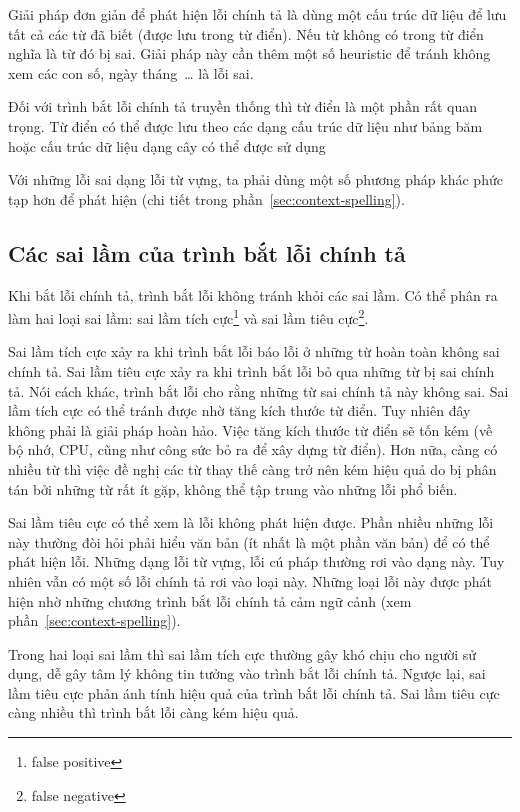\documentclass[a4paper,oneside,14pt]{extbook} %
\begin{document}
Giải pháp đơn giản để phát hiện lỗi chính tả là dùng một cấu trúc dữ
liệu để lưu tất cả các từ đã biết (được lưu trong từ điển). Nếu từ
không có trong từ điển nghĩa là từ đó bị sai. Giải pháp này cần thêm
một số heuristic để tránh không xem các con số, ngày tháng~\ldots{} là
lỗi sai.

Đối với trình bắt lỗi chính tả truyền thống thì từ điển là một phần
rất quan trọng. Từ điển có thể được lưu theo các dạng
cấu trúc dữ liệu như bảng băm hoặc cấu trúc dữ liệu dạng cây có thể
được sử dụng~\cite{McIlroy,Peterson}

Với những lỗi sai dạng lỗi từ vựng, ta phải dùng một số phương pháp
khác phức tạp hơn để phát hiện (chi tiết trong
phần~\ref{sec:context-spelling}). 

\subsection{Các sai lầm của trình bắt lỗi chính tả}

Khi bắt lỗi chính tả, trình bắt lỗi không tránh khỏi các sai lầm. Có
thể phân ra làm hai loại sai lầm: sai lầm tích cực\footnote{false
  positive} và sai lầm tiêu cực\footnote{false negative}.

Sai lầm tích cực xảy ra khi trình bắt lỗi báo lỗi ở những từ hoàn toàn
không sai chính tả. Sai lầm tiêu cực xảy ra khi trình bắt lỗi bỏ qua
những từ bị sai chính tả. Nói cách khác, trình bắt lỗi cho rằng những
từ sai chính tả này không sai. Sai lầm tích cực có thể tránh được nhờ
tăng kích thước từ điển. Tuy nhiên đây không phải là giải pháp hoàn
hảo. Việc tăng kích thước từ điển sẽ tốn kém (về bộ nhớ, CPU, cũng như
công sức bỏ ra để xây dựng từ điển). Hơn nữa, càng có nhiều
từ thì việc đề nghị các từ thay thế càng trở nên kém hiệu quả do bị
phân tán bởi những từ rất ít gặp, không thể tập trung vào những lỗi
phổ biến. 

Sai lầm tiêu cực có thể xem là lỗi không phát hiện được. Phần nhiều
những lỗi này thường đòi hỏi phải hiểu văn bản (ít nhất là một phần
văn bản) để có thể phát hiện lỗi. Những dạng lỗi từ vựng, lỗi cú pháp
thường rơi vào dạng này. Tuy nhiên vẫn có một số lỗi chính tả rơi vào
loại này. Những loại lỗi này được phát hiện nhờ những chương trình bắt
lỗi chính tả cảm ngữ cảnh (xem phần~\ref{sec:context-spelling}).


Trong hai loại sai lầm thì sai lầm tích cực thường gây khó chịu cho
người sử dụng, dễ gây tâm lý không tin tưởng vào trình bắt lỗi chính
tả. Ngược lại, sai lầm tiêu cực phản ánh tính hiệu quả của trình bắt
lỗi chính tả. Sai lầm tiêu cực càng nhiều thì trình bắt lỗi càng kém
hiệu quả.
\end{document}
